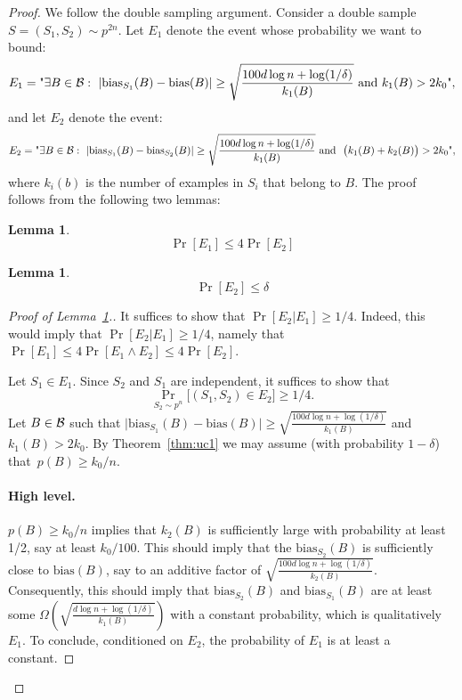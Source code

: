 \documentclass{article}
\newtheorem{lemma}[theorem]{Lemma}
\newcommand{\B}{{\cal B}}
\newcommand{\bias}{\text{bias}}
\newcommand{\samp}{S}
\begin{document}
\begin{proof}
We follow the double sampling argument.
Consider a double sample $S=(\samp_1,\samp_2)\sim p^{2n}$.
Let $E_1$ denote the event whose probability we want to bound:
\[
E_1 = \text{"}\exists {B\in\B}:~\lvert \bias_{\samp_1}(B) -
\bias(B)\rvert \geq \sqrt{\frac{100d\log n + \log(1/\delta)}{k_1(B)}}
\mbox{ and } k_1(B)>2k_0
\text{"}, 
\]
and let $E_2$ denote the event:
\[
E_2 = \text{"}\exists {B\in\B}:~\lvert \bias_{\samp_1}(B) -  \bias_{\samp_2}(B)\rvert \geq \sqrt{\frac{100d\log n + \log(1/\delta)}{k_1(B)}}
  \mbox{ and }~ \bigl(k_1(B) + k_2(B)\bigr)>2k_0
  \text{"},
\]
where $k_i(b)$ is the number of examples in $S_i$ that belong to $B$.
The proof follows from the following two lemmas:
\begin{lemma}\label{lem:aux1}
\[\Pr[E_1]\leq 4\Pr[E_2]\]
\end{lemma}
\begin{lemma}\label{lem:aux2}
\[\Pr[E_2]\leq \delta\]
\end{lemma}

\begin{proof}[Proof of Lemma~\ref{lem:aux1}.]

It suffices to show that $\Pr[E_2 \vert E_1]\geq 1/4$.
Indeed, this would imply that $\Pr[E_2 \vert E_1]\geq 1/4$, 
namely that $\Pr[E_1] \leq 4\Pr[E_1 \land E_2]\leq 4\Pr[E_2]$.

Let $S_1\in E_1$. Since $S_2$ and $S_1$ are independent,
it suffices to show that 
\[\Pr_{S_2\sim p^n}\bigl[(S_1,S_2)\in E_2\bigr] \geq 1/4.\]
Let $B\in\B$ such that $\lvert \bias_{\samp_1}(B) -  \bias(B)\rvert \geq \sqrt{\frac{100d\log n + \log(1/\delta)}{k_1(B)} }$
and $k_1(B) > 2k_0$. 
By Theorem~\ref{thm:uc1} we may assume (with probability $1-\delta$)
that~$p(B)\geq k_0/n$.

\paragraph{High level.} $p(B)\geq k_0/n$ implies that $k_2(B)$ is sufficiently large with probability at least 1/2,
say at least $k_0/100$.
This should imply that the $\bias_{\samp_2}(B)$ is sufficiently close
to $\bias(B)$, say to an additive factor of $\sqrt{\frac{100d\log n + \log(1/\delta)}{k_2(B)}}$.
Consequently, this should imply that $\bias_{\samp_2}(B)$ and $\bias_{\samp_1}(B)$
are at least some $\Omega(\sqrt{\frac{d\log n + \log(1/\delta)}{k_1(B)}})$ with a constant probability,
which is qualitatively $E_1$. To conclude, conditioned on $E_2$, the probability of $E_1$
is at least a constant.
\end{proof}


\end{proof}
\end{document}
